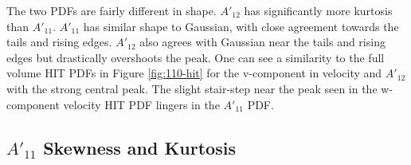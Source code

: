 \documentclass[12pt]{article}
\begin{document}
The two PDFs are fairly different in shape. $A'_{12}$ has significantly more kurtosis than $A'_{11}$. $A'_{11}$ has similar shape to Gaussian, with close agreement towards the tails and rising edges. $A'_{12}$ also agrees with Gaussian near the tails and rising edges but drastically overshoots the peak. One can see a similarity to the full volume HIT PDFs in Figure \ref{fig:110-hit} for the v-component in velocity and $A'_{12}$ with the strong central peak. The slight stair-step near the peak seen in the w-component velocity HIT PDF lingers in the $A'_{11}$ PDF. 

\subsection{$A'_{11}$ Skewness and Kurtosis}





















































%
%
\end{document}
